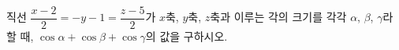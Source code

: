 직선 $\dfrac{x-2}{2}=-y-1=\dfrac{z-5}{2}$가 $x$축, $y$축, $z$축과 이루는 각의 크기를 각각 $\alpha$, $\beta$, $\gamma$라 할 때, $\cos\alpha+\cos\beta+\cos\gamma$의 값을 구하시오.
